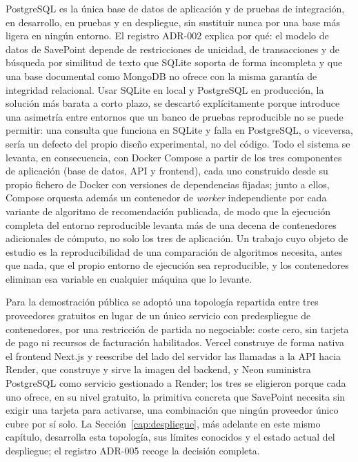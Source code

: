 PostgreSQL es la única base de datos de aplicación y de pruebas de integración, en desarrollo,
en pruebas y en despliegue, sin sustituir nunca por una base más ligera en ningún entorno. El
registro ADR-002 explica por qué: el modelo de datos de SavePoint depende de restricciones de
unicidad, de transacciones y de búsqueda por similitud de texto que SQLite soporta de forma
incompleta y que una base documental como MongoDB no ofrece con la misma garantía de
integridad relacional. Usar SQLite en local y PostgreSQL en producción, la solución más
barata a corto plazo, se descartó explícitamente porque introduce una asimetría entre entornos
que un banco de pruebas reproducible no se puede permitir: una consulta que funciona en SQLite
y falla en PostgreSQL, o viceversa, sería un defecto del propio diseño experimental, no del
código. Todo el sistema se levanta, en consecuencia, con Docker Compose a partir de los tres
componentes de aplicación (base de datos, API y frontend), cada uno construido desde su propio
fichero de Docker con versiones de dependencias fijadas; junto a ellos, Compose orquesta además
un contenedor de \textit{worker} independiente por cada variante de algoritmo de recomendación
publicada, de modo que la ejecución completa del entorno reproducible levanta más de una decena
de contenedores adicionales de cómputo, no solo los tres de aplicación. Un trabajo cuyo objeto
de estudio es la reproducibilidad de una comparación de algoritmos necesita, antes que nada,
que el propio entorno de ejecución sea reproducible, y los contenedores eliminan esa variable
en cualquier máquina que lo levante.

Para la demostración pública se adoptó una topología repartida entre tres proveedores
gratuitos en lugar de un único servicio con predespliegue de contenedores, por una restricción
de partida no negociable: coste cero, sin tarjeta de pago ni recursos de facturación
habilitados. Vercel construye de forma nativa el frontend Next.js y reescribe del lado del
servidor las llamadas a la API hacia Render, que construye y sirve la imagen del backend, y
Neon suministra PostgreSQL como servicio gestionado a Render; los tres se eligieron porque cada
uno ofrece, en su nivel gratuito, la primitiva concreta que SavePoint necesita sin exigir una
tarjeta para activarse, una combinación que ningún proveedor único cubre por sí solo. La
Sección~\ref{cap:despliegue}, más adelante en este mismo capítulo, desarrolla esta topología,
sus límites conocidos y el estado actual del despliegue; el registro ADR-005 recoge la
decisión completa.

